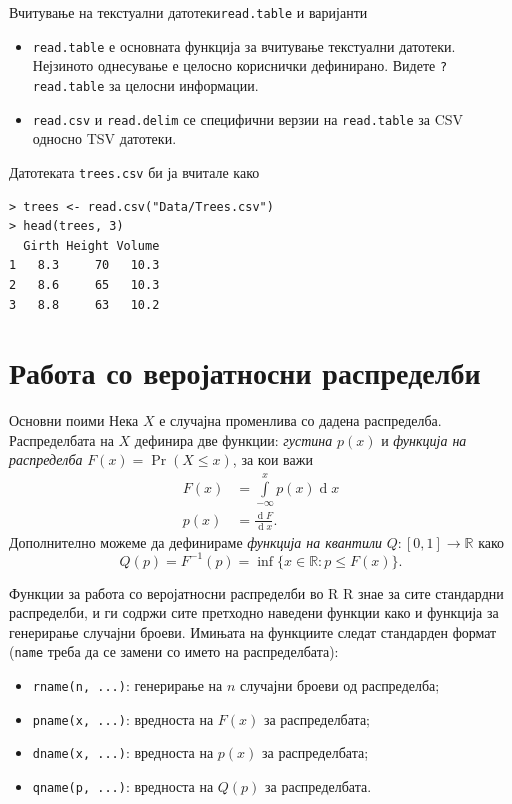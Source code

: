 \documentclass[hyperref={unicode}, xcolor={svgnames, table},
usepdftitle=false]{beamer}
\theoremstyle{remark}
\begin{document}
\begin{frame}[fragile]{Вчитување на текстуални
    датотеки}{\texttt{read.table} и варијанти}
  \begin{itemize}
  \item \texttt{read.table} е основната функција за вчитување текстуални
    датотеки.  Нејзиното однесување е целосно кориснички дефинирано.  Видете
    \texttt{?read.table} за целосни информации.
  \item \texttt{read.csv} и \texttt{read.delim} се специфични
    верзии на \texttt{read.table} за CSV односно TSV датотеки.
  \end{itemize}

  Датотеката \texttt{trees.csv} би ја вчитале како
\begin{verbatim}
> trees <- read.csv("Data/Trees.csv")
> head(trees, 3)
  Girth Height Volume
1   8.3     70   10.3
2   8.6     65   10.3
3   8.8     63   10.2
\end{verbatim}
\end{frame}

\section{Работа со веројатносни распределби}

\begin{frame}{Основни поими}
  Нека \(X\) е случајна променлива со дадена распределба.  Распределбата на
  \(X\) дефинира две функции: \emph{густина} \(p(x)\) и \emph{функција на
    распределба} \(F(x) = \Pr(X \le x)\), за кои важи
\begin{align*}
  F(x) &= \int\limits_{-\infty}^{x} p(x) \operatorname d x \\
  p(x) &= \frac{\operatorname d F}{\operatorname d x}\text{.}
\end{align*}
Дополнително можеме да дефинираме \emph{функција на квантили}
\(Q \colon [0, 1] \to \mathbb{R}\) како
\[
  Q(p) = F^{-1}(p) = \inf\{x \in \mathbb{R} : p \le F(x)\}\text{.}
\]
\end{frame}

\begin{frame}{Функции за работа со веројатносни распределби во R}
  R знае за сите стандардни распределби, и ги содржи сите претходно наведени
  функции како и функција за генерирање случајни броеви.  Имињата на функциите
  следат стандарден формат (\texttt{name} треба да се замени со името на
  распределбата):
  \begin{itemize}
  \item \texttt{rname(n, ...)}: генерирање на \(n\) случајни броеви од
    распределба;
  \item \texttt{pname(x, ...)}: вредноста на \(F(x)\) за распределбата;
  \item \texttt{dname(x, ...)}: вредноста на \(p(x)\) за распределбата;
  \item \texttt{qname(p, ...)}: вредноста на \(Q(p)\) за распределбата.
  \end{itemize}
\end{frame}
\end{document}
